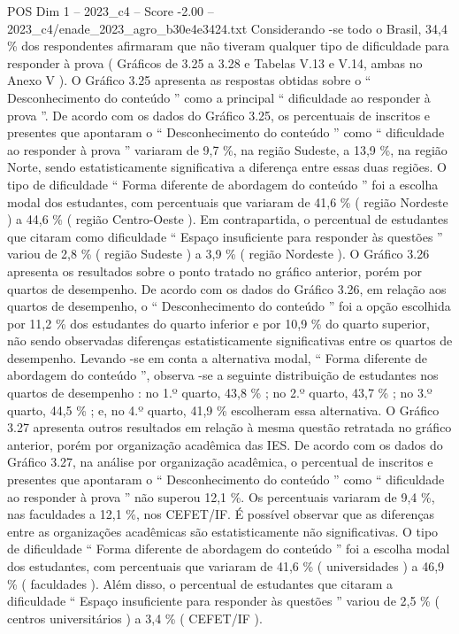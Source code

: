 \begin{textsample}{POS Dim 1 – 2023\_c4 – Score -2.00 – 2023\_c4/enade\_2023\_agro\_b30e4e3424.txt}
Considerando -se todo o Brasil, 34,4 \% dos respondentes afirmaram que não tiveram qualquer tipo de dificuldade para responder à prova ( Gráficos de 3.25 a 3.28 e Tabelas V.13 e V.14, ambas no Anexo V ).
O Gráfico 3.25 apresenta as respostas obtidas sobre o “ Desconhecimento do conteúdo ” como a principal “ dificuldade ao responder à prova ”.
De acordo com os dados do Gráfico 3.25, os percentuais de inscritos e presentes que apontaram o “ Desconhecimento do conteúdo ” como “ dificuldade ao responder à prova ” variaram de 9,7 \%, na região Sudeste, a 13,9 \%, na região Norte, sendo estatisticamente significativa a diferença entre essas duas regiões.
O tipo de dificuldade “ Forma diferente de abordagem do conteúdo ” foi a escolha modal dos estudantes, com percentuais que variaram de 41,6 \% ( região Nordeste ) a 44,6 \% ( região Centro-Oeste ).
Em contrapartida, o percentual de estudantes que citaram como dificuldade “ Espaço insuficiente para responder às questões ” variou de 2,8 \% ( região Sudeste ) a 3,9 \% ( região Nordeste ).
O Gráfico 3.26 apresenta os resultados sobre o ponto tratado no gráfico anterior, porém por quartos de desempenho.
De acordo com os dados do Gráfico 3.26, em relação aos quartos de desempenho, o “ Desconhecimento do conteúdo ” foi a opção escolhida por 11,2 \% dos estudantes do quarto inferior e por 10,9 \% do quarto superior, não sendo observadas diferenças estatisticamente significativas entre os quartos de desempenho.
Levando -se em conta a alternativa modal, “ Forma diferente de abordagem do conteúdo ”, observa -se a seguinte distribuição de estudantes nos quartos de desempenho : no 1.º quarto, 43,8 \% ; no 2.º quarto, 43,7 \% ; no 3.º quarto, 44,5 \% ; e, no 4.º quarto, 41,9 \% escolheram essa alternativa.
O Gráfico 3.27 apresenta outros resultados em relação à mesma questão retratada no gráfico anterior, porém por organização acadêmica das IES.
De acordo com os dados do Gráfico 3.27, na análise por organização acadêmica, o percentual de inscritos e presentes que apontaram o “ Desconhecimento do conteúdo ” como “ dificuldade ao responder à prova ” não superou 12,1 \%.
Os percentuais variaram de 9,4 \%, nas faculdades a 12,1 \%, nos CEFET/IF.
É possível observar que as diferenças entre as organizações acadêmicas são estatisticamente não significativas.
O tipo de dificuldade “ Forma diferente de abordagem do conteúdo ” foi a escolha modal dos estudantes, com percentuais que variaram de 41,6 \% ( universidades ) a 46,9 \% ( faculdades ).
Além disso, o percentual de estudantes que citaram a dificuldade “ Espaço insuficiente para responder às questões ” variou de 2,5 \% ( centros universitários ) a 3,4 \% ( CEFET/IF ).

\end{textsample}
